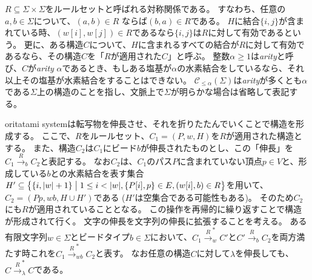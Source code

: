 \documentclass[a4,11pt]{article}
\begin{document}
$R \subseteq \Sigma \times \Sigma$をルールセットと呼ばれる対称関係である。
すなわち、任意の$a, b \in \Sigma$について、$(a, b) \in R$ ならば$(b, a) \in R$である。
$H$に結合$\{i,j\}$が含まれている時、$(w[i],w[j]) \in R$であるなら$\{i,j\}$は$R$に対して有効であるという。
更に、ある構造$C$について、$H$に含まれるすべての結合が$R$に対して有効であるなら、その構造$C$を「$R$が適用された$C$」と呼ぶ。
整数$\alpha \ge 1$は\textit{arity}と呼び、$C$が\textit{arity} $\alpha$であるとき、もしある塩基が$\alpha$の水素結合をしているなら、それ以上その塩基が水素結合をすることはできない。
$\mathcal{C}_{\le \alpha}(\Sigma)$は\textit{arity}が多くとも$\alpha$である$\Sigma$上の構造のことを指し、文脈上で$\Sigma$が明らかな場合は省略して表記する。


oritatami systemは転写物を伸長させ、それを折りたたんでいくことで構造を形成する。
ここで、$R$をルールセット、$C_1 = (P, w, H)$を$R$が適用された構造とする。
また、構造$C_2$は$C_1$にビード$b$が伸長されたものとし、この「伸長」を$C_1 \xrightarrow{R}_b C_2$と表記する。
なお$C_2$は、$C_1$のパス$P$に含まれていない頂点$p \in V$と、形成している$b$との水素結合を表す集合$H' \subseteq \bigl\{ \{i, |w|+1\} \bigm| 1 \le i < |w|, \{P[i], p\} \in E, (w[i], b) \in R \bigr\}$を用いて、$C_2 = (P p, wb, H \cup H')$である ($H'$は空集合である可能性もある)。
そのため$C_2$にも$R$が適用されていることとなる。
この操作を再帰的に繰り返すことで構造が形成されて行く。
文字の伸長を文字列の伸長に拡張することを考える。
ある有限文字列$w \in \Sigma$とビードタイプ$b \in \Sigma$において、$C_1 \xrightarrow{R}_w^* C'$と$C' \xrightarrow{R}_b C_2$を両方満たす時これを$C_1 \xrightarrow{R}_{wb}^* C_2$と表す。
なお任意の構造$C$に対して$\lambda$を伸長しても、$C \xrightarrow{R}_\lambda^* C$である。
\end{document}
